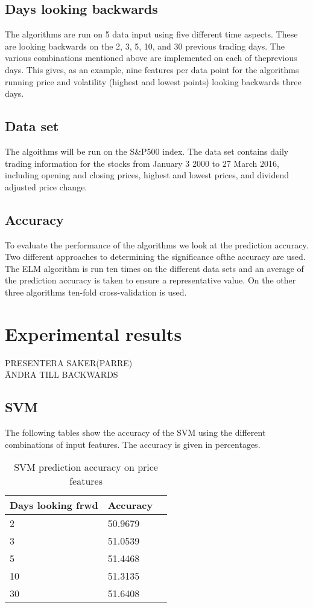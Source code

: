 \documentclass{article}
\begin{document}
\subsection{Days looking backwards}
The algorithms are run on 5 data input using five different time aspects. These are looking backwards on the 2, 3, 5, 10, and 30 previous trading days. The various combinations mentioned above are implemented on each of theprevious days. This gives, as an example, nine features per data point for the algorithms running price and volatility (highest and lowest points) looking backwards three days.

\subsection{Data set}
The algoithms will be run on the S\&P500 index. The data set contains daily trading information for the stocks from January 3 2000 to 27 March 2016, including opening and closing prices, highest and lowest prices, and dividend adjusted price change. 

\subsection{Accuracy} 
To evaluate the performance of the algorithms we look at the prediction accuracy. Two different approaches to determining the significance ofthe accuracy are used. The ELM algorithm is run ten times on the different data sets and an average of the prediction accuracy is taken to ensure a representative value. On the other three algorithms ten-fold cross-validation is used. 
\newpage

\section{Experimental results}
PRESENTERA SAKER(PARRE) \\
ÄNDRA TILL BACKWARDS
\subsection{SVM}
The following tables show the accuracy of the SVM using the different combinations of input features. The accuracy is given in percentages.
\begin{table}[!h]
\begin{center}
    \begin{tabular}{ | l | l | p{3cm} |}
    \hline
    Days looking frwd & Accuracy \\ \hline
    2 & 50.9679  \\ \hline
    3 & 51.0539  \\ \hline
    5 & 51.4468  \\ \hline
    10 & 51.3135  \\ \hline
    30 & 51.6408 \\ 
    \hline
    \end{tabular}
\caption{SVM prediction accuracy on price features}
\end{center}
\end{table}
\end{document}
